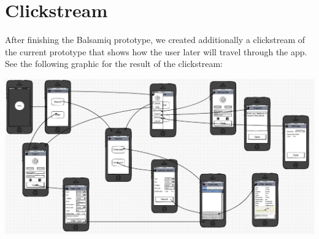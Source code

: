 \documentclass[11pt,twoside,a4paper]{report}
\begin{document}
\section{Clickstream}

After ﬁnishing the Balsamiq prototype, we created additionally a clickstream
of the current prototype that shows how the user later will travel through
the app. See the following graphic for the result of the clickstream:

\includegraphics[scale=0.55]{clickstream.jpg}
\end{document}
